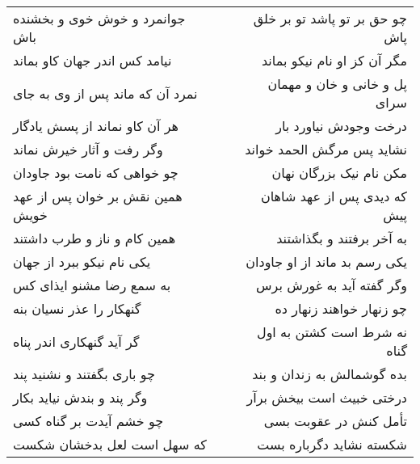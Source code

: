 \begin{center}
\begin{longtable}{l p{0.5cm} r}
\\
جوانمرد و خوش خوی و بخشنده باش
&&
چو حق بر تو پاشد تو بر خلق پاش
\\
نیامد کس اندر جهان کاو بماند
&&
مگر آن کز او نام نیکو بماند
\\
نمرد آن که ماند پس از وی به جای
&&
پل و خانی و خان و مهمان سرای
\\
هر آن کاو نماند از پسش یادگار
&&
درخت وجودش نیاورد بار
\\
وگر رفت و آثار خیرش نماند
&&
نشاید پس مرگش الحمد خواند
\\
چو خواهی که نامت بود جاودان
&&
مکن نام نیک بزرگان نهان
\\
همین نقش بر خوان پس از عهد خویش
&&
که دیدی پس از عهد شاهان پیش
\\
همین کام و ناز و طرب داشتند
&&
به آخر برفتند و بگذاشتند
\\
یکی نام نیکو ببرد از جهان
&&
یکی رسم بد ماند از او جاودان
\\
به سمع رضا مشنو ایذای کس
&&
وگر گفته آید به غورش برس
\\
گنهکار را عذر نسیان بنه
&&
چو زنهار خواهند زنهار ده
\\
گر آید گنهکاری اندر پناه
&&
نه شرط است کشتن به اول گناه
\\
چو باری بگفتند و نشنید پند
&&
بده گوشمالش به زندان و بند
\\
وگر پند و بندش نیاید بکار
&&
درختی خبیث است بیخش برآر
\\
چو خشم آیدت بر گناه کسی
&&
تأمل کنش در عقوبت بسی
\\
که سهل است لعل بدخشان شکست
&&
شکسته نشاید دگرباره بست
\\
\end{longtable}
\end{center}
